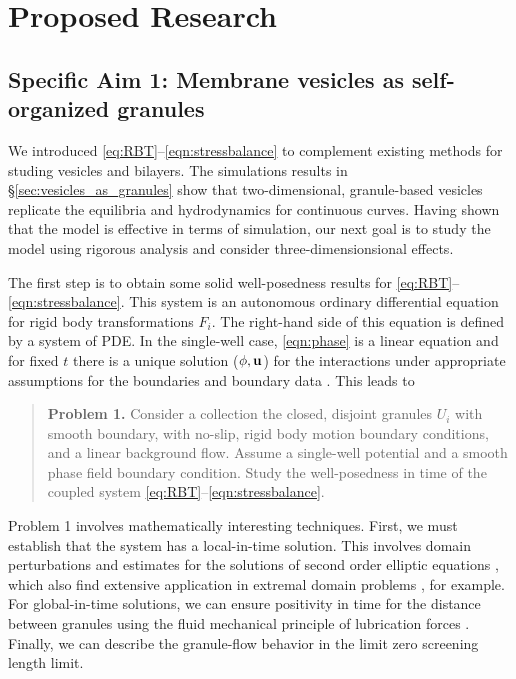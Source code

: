 \section{Proposed Research}
\label{sec:proposed-work}

\subsection{Specific Aim 1: Membrane vesicles as self-organized granules}
\label{sec:specific_aim1}
We introduced \eqref{eq:RBT}--\eqref{eqn:stressbalance} to complement
existing methods for studing vesicles and bilayers. 
The simulations results in \S \ref{sec:vesicles_as_granules}
show that two-dimensional, granule-based vesicles replicate the 
equilibria and hydrodynamics for continuous curves.
Having shown that the model is effective in terms of simulation,
our next goal is to study the model using rigorous analysis
and consider three-dimensionsional effects. 

The first step is to obtain some solid well-posedness results
for \eqref{eq:RBT}--\eqref{eqn:stressbalance}.
This system is an autonomous ordinary differential equation for
rigid body transformations $F_i$.  The right-hand side of this
equation is defined by a system of PDE.  In the single-well case,
\eqref{eqn:phase} is a linear equation
and for fixed $t$ there is a unique solution
($\phi, \mathbf{u}$) for the interactions under appropriate
assumptions for the boundaries and boundary data
\cite{manasthesis,rac-gre2016,LAX}.
This leads to 
\begin{quotation}
  \textbf{Problem 1.} 
  Consider a collection the closed, disjoint granules
  $U_i$ with smooth boundary, with no-slip, rigid body
  motion boundary conditions, and a linear background flow.
  Assume a single-well potential and a smooth phase field
  boundary condition.  Study the well-posedness in
  time of the coupled system \eqref{eq:RBT}--\eqref{eqn:stressbalance}.
\end{quotation}
Problem 1 involves mathematically interesting techniques.
First, we must establish that the system has a local-in-time solution.
This involves domain perturbations and estimates for the
solutions of second order elliptic equations
\cite{Savar2002DomainPA, DANERS20081, Lamboley2015EstimatesOF},
which also find extensive application in extremal domain problems
\cite{Schiffer1954VariationOD, Henrot2006ExtremumPF,
  bogosel:hal-03607776,Bogosel2022OnTP}, for example.
For global-in-time solutions,
we can ensure positivity in time for the distance between granules
using the fluid mechanical principle of
lubrication forces \cite{cawthorn_balmforth_2010, leal_2007}.
Finally, we can describe the granule-flow
behavior in the limit zero screening length limit.

